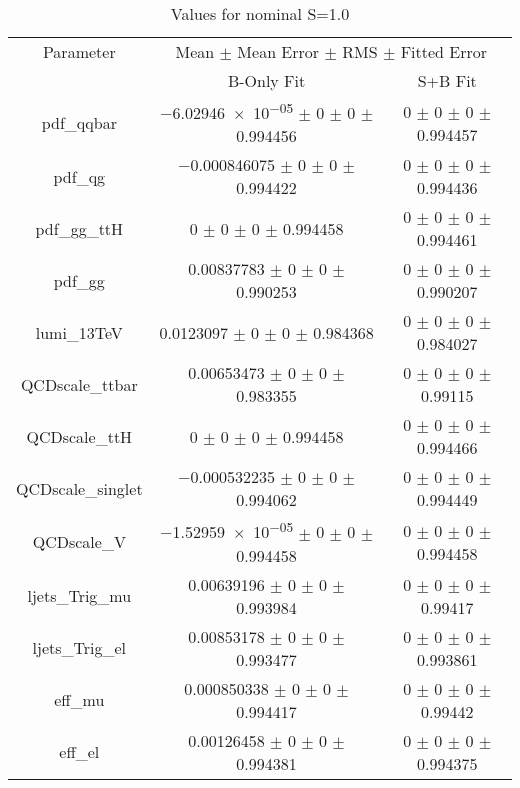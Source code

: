 \begin{table}
\centering
\caption{Values for nominal S=1.0}
\begin{tabular}{ccc}
\toprule
Parameter 	& \multicolumn{2}{c}{Mean $\pm$ Mean Error $\pm$ RMS $\pm$ Fitted Error}\\
 	& B-Only Fit & S+B Fit\\
\midrule
pdf\_qqbar 	& \num{-6.02946e-05} $\pm$ \num{0} $\pm$ \num{0} $\pm$ \num{0.994456} 	& \num{0} $\pm$ \num{0} $\pm$ \num{0} $\pm$ \num{0.994457}\\
pdf\_qg 	& \num{-0.000846075} $\pm$ \num{0} $\pm$ \num{0} $\pm$ \num{0.994422} 	& \num{0} $\pm$ \num{0} $\pm$ \num{0} $\pm$ \num{0.994436}\\
pdf\_gg\_ttH 	& \num{0} $\pm$ \num{0} $\pm$ \num{0} $\pm$ \num{0.994458} 	& \num{0} $\pm$ \num{0} $\pm$ \num{0} $\pm$ \num{0.994461}\\
pdf\_gg 	& \num{0.00837783} $\pm$ \num{0} $\pm$ \num{0} $\pm$ \num{0.990253} 	& \num{0} $\pm$ \num{0} $\pm$ \num{0} $\pm$ \num{0.990207}\\
lumi\_13TeV 	& \num{0.0123097} $\pm$ \num{0} $\pm$ \num{0} $\pm$ \num{0.984368} 	& \num{0} $\pm$ \num{0} $\pm$ \num{0} $\pm$ \num{0.984027}\\
QCDscale\_ttbar 	& \num{0.00653473} $\pm$ \num{0} $\pm$ \num{0} $\pm$ \num{0.983355} 	& \num{0} $\pm$ \num{0} $\pm$ \num{0} $\pm$ \num{0.99115}\\
QCDscale\_ttH 	& \num{0} $\pm$ \num{0} $\pm$ \num{0} $\pm$ \num{0.994458} 	& \num{0} $\pm$ \num{0} $\pm$ \num{0} $\pm$ \num{0.994466}\\
QCDscale\_singlet 	& \num{-0.000532235} $\pm$ \num{0} $\pm$ \num{0} $\pm$ \num{0.994062} 	& \num{0} $\pm$ \num{0} $\pm$ \num{0} $\pm$ \num{0.994449}\\
QCDscale\_V 	& \num{-1.52959e-05} $\pm$ \num{0} $\pm$ \num{0} $\pm$ \num{0.994458} 	& \num{0} $\pm$ \num{0} $\pm$ \num{0} $\pm$ \num{0.994458}\\
ljets\_Trig\_mu 	& \num{0.00639196} $\pm$ \num{0} $\pm$ \num{0} $\pm$ \num{0.993984} 	& \num{0} $\pm$ \num{0} $\pm$ \num{0} $\pm$ \num{0.99417}\\
ljets\_Trig\_el 	& \num{0.00853178} $\pm$ \num{0} $\pm$ \num{0} $\pm$ \num{0.993477} 	& \num{0} $\pm$ \num{0} $\pm$ \num{0} $\pm$ \num{0.993861}\\
eff\_mu 	& \num{0.000850338} $\pm$ \num{0} $\pm$ \num{0} $\pm$ \num{0.994417} 	& \num{0} $\pm$ \num{0} $\pm$ \num{0} $\pm$ \num{0.99442}\\
eff\_el 	& \num{0.00126458} $\pm$ \num{0} $\pm$ \num{0} $\pm$ \num{0.994381} 	& \num{0} $\pm$ \num{0} $\pm$ \num{0} $\pm$ \num{0.994375}\\

\end{tabular}
\end{table}
